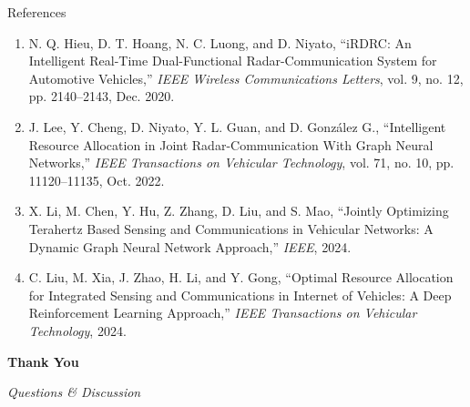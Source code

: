 \documentclass[aspectratio=169]{beamer}
\begin{document}
\begin{frame}{References}
  \footnotesize
  \begin{enumerate}
    \setlength{\itemsep}{0.15cm}
    \item N. Q. Hieu, D. T. Hoang, N. C. Luong, and D. Niyato, ``iRDRC: An Intelligent Real-Time Dual-Functional Radar-Communication System for Automotive Vehicles,'' \textit{IEEE Wireless Communications Letters}, vol. 9, no. 12, pp. 2140--2143, Dec. 2020.
    \item J. Lee, Y. Cheng, D. Niyato, Y. L. Guan, and D. Gonz\'alez G., ``Intelligent Resource Allocation in Joint Radar-Communication With Graph Neural Networks,'' \textit{IEEE Transactions on Vehicular Technology}, vol. 71, no. 10, pp. 11120--11135, Oct. 2022.
    \item X. Li, M. Chen, Y. Hu, Z. Zhang, D. Liu, and S. Mao, ``Jointly Optimizing Terahertz Based Sensing and Communications in Vehicular Networks: A Dynamic Graph Neural Network Approach,'' \textit{IEEE}, 2024.
    \item C. Liu, M. Xia, J. Zhao, H. Li, and Y. Gong, ``Optimal Resource Allocation for Integrated Sensing and Communications in Internet of Vehicles: A Deep Reinforcement Learning Approach,'' \textit{IEEE Transactions on Vehicular Technology}, 2024.
  \end{enumerate}
\end{frame}

\begin{frame}[plain]
  \vspace{2cm}
  \begin{center}
    {\Huge\bfseries\color{iiitblue} Thank You}
    \vspace{1.5cm}

    {\Large\textit{Questions \& Discussion}}
  \end{center}
\end{frame}
\end{document}

